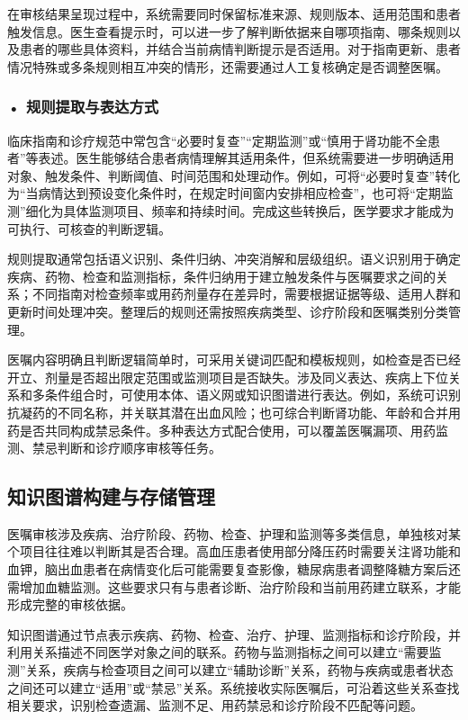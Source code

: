 在审核结果呈现过程中，系统需要同时保留标准来源、规则版本、适用范围和患者触发信息。医生查看提示时，可以进一步了解判断依据来自哪项指南、哪条规则以及患者的哪些具体资料，并结合当前病情判断提示是否适用。对于指南更新、患者情况特殊或多条规则相互冲突的情形，还需要通过人工复核确定是否调整医嘱。


\subsubsection*{\textbf{• 规则提取与表达方式}}

临床指南和诊疗规范中常包含“必要时复查”“定期监测”或“慎用于肾功能不全患者”等表述。医生能够结合患者病情理解其适用条件，但系统需要进一步明确适用对象、触发条件、判断阈值、时间范围和处理动作。例如，可将“必要时复查”转化为“当病情达到预设变化条件时，在规定时间窗内安排相应检查”，也可将“定期监测”细化为具体监测项目、频率和持续时间。完成这些转换后，医学要求才能成为可执行、可核查的判断逻辑。

规则提取通常包括语义识别、条件归纳、冲突消解和层级组织。语义识别用于确定疾病、药物、检查和监测指标，条件归纳用于建立触发条件与医嘱要求之间的关系；不同指南对检查频率或用药剂量存在差异时，需要根据证据等级、适用人群和更新时间处理冲突。整理后的规则还需按照疾病类型、诊疗阶段和医嘱类别分类管理。

医嘱内容明确且判断逻辑简单时，可采用关键词匹配和模板规则，如检查是否已经开立、剂量是否超出限定范围或监测项目是否缺失。涉及同义表达、疾病上下位关系和多条件组合时，可使用本体、语义网或知识图谱进行表达。例如，系统可识别抗凝药的不同名称，并关联其潜在出血风险；也可综合判断肾功能、年龄和合并用药是否共同构成禁忌条件。多种表达方式配合使用，可以覆盖医嘱漏项、用药监测、禁忌判断和诊疗顺序审核等任务。

\subsection{知识图谱构建与存储管理}

医嘱审核涉及疾病、治疗阶段、药物、检查、护理和监测等多类信息，单独核对某个项目往往难以判断其是否合理。高血压患者使用部分降压药时需要关注肾功能和血钾，脑出血患者在病情变化后可能需要复查影像，糖尿病患者调整降糖方案后还需增加血糖监测。这些要求只有与患者诊断、治疗阶段和当前用药建立联系，才能形成完整的审核依据。

知识图谱通过节点表示疾病、药物、检查、治疗、护理、监测指标和诊疗阶段，并利用关系描述不同医学对象之间的联系。药物与监测指标之间可以建立“需要监测”关系，疾病与检查项目之间可以建立“辅助诊断”关系，药物与疾病或患者状态之间还可以建立“适用”或“禁忌”关系。系统接收实际医嘱后，可沿着这些关系查找相关要求，识别检查遗漏、监测不足、用药禁忌和诊疗阶段不匹配等问题。

